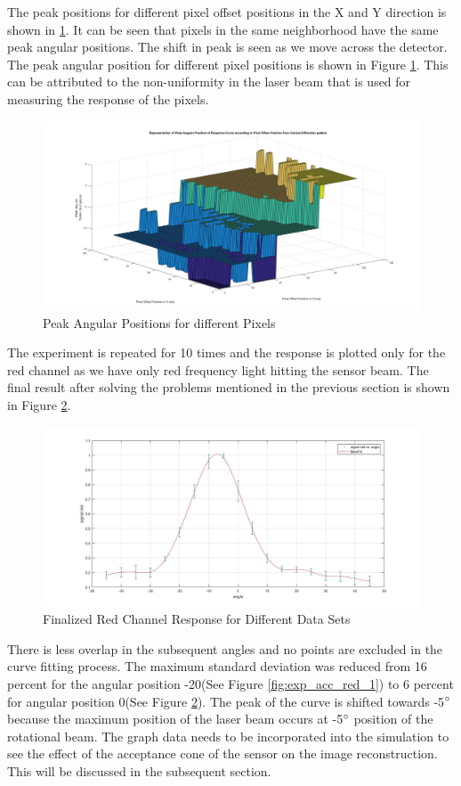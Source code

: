 The peak positions for different pixel offset positions in the X and Y direction is shown in \ref{fig:peak_pixel_pos}. It can be seen that pixels in the same neighborhood have the same peak angular positions. The shift in peak is seen as we move across the detector.  The peak angular position for different pixel positions is shown in Figure \ref{fig:peak_pixel_pos}.
This can be attributed to the non-uniformity in the laser beam that is used for measuring the response of the pixels.
\begin{figure}[!h]
\centering
\includegraphics[width = \textwidth]{pics/MeshPlotAngularPeak}
\caption{Peak Angular Positions for different Pixels}
\label{fig:peak_pixel_pos}
\end{figure}

The experiment is repeated for 10 times and the response is plotted only for the red channel as we have only red frequency light hitting the sensor beam. The final result after solving the problems mentioned in the previous section is shown in Figure \ref{fig:acceptance_final}.
\begin{figure}[!h]
\centering
\includegraphics[width = \textwidth]{pics/FinalCRAExp}
\caption{Finalized Red Channel Response for Different Data Sets}
\label{fig:acceptance_final}
\end{figure}
There is less overlap in the subsequent angles and no points are excluded in the curve fitting process. The maximum standard deviation was reduced from 16 percent for the angular position -20(See Figure \ref{fig:exp_acc_red_1}) to 6 percent for angular position 0(See Figure \ref{fig:acceptance_final}). The peak of the curve is shifted towards -5$\degree$ because the maximum position of the laser beam occurs at -5$\degree$ position of the rotational beam. The graph data needs to be incorporated into the simulation to see the effect of the acceptance cone of the sensor on the image reconstruction. This will be discussed in the subsequent section.
